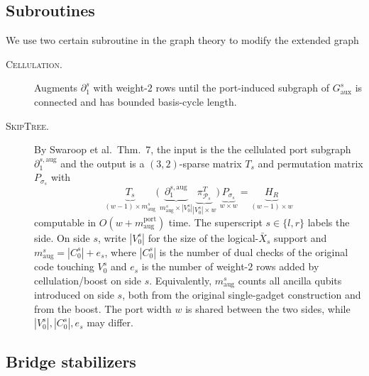\documentclass[a4paper, 12pt]{article}
\begin{document}
  \subsection{Subroutines}
  We use two certain subroutine in the graph theory to modify the extended graph
  \begin{description}
  \item[\textsc{Cellulation}.] Augments $\partial_1^{s}$ with weight-$2$ rows until the port-induced
  subgraph of $G_{\mathrm{aux}}^s$ is connected and has bounded basis-cycle length.
  \item[\textsc{SkipTree}.]     By Swaroop et al.\ Thm.~7, the input is the  the cellulated port subgraph $\partial_1^{s,\mathrm{aug}}$ and the output is a $(3,2)$-sparse
  matrix $T_s$ and permutation matrix $P_{\sigma_s}$ with
   \begin{equation}
  \underbrace{T_s}_{(w-1)\times m^s_{\mathrm{aug}}}
  \Bigg(\underbrace{\partial_1^{s,\mathrm{aug}}}_{m^s_{\mathrm{aug}}\times|V_0^s|}
  \underbrace{\pi_{\mathcal{P}_s}^T}_{|V_0^s|\times w}
  \Bigg)
  \underbrace{P_{\sigma_s}}_{w\times w}
  =
  \underbrace{H_R}_{(w-1)\times w}
  \end{equation}
  computable in $O(w + m^{\mathrm{port}}_{\mathrm{aug}})$ time. The superscript $s \in \{l, r\}$ labels the side. On side $s$, write $|V_0^s|$ for
   the size of the logical-$\bar X_s$ support and $m^s_{\mathrm{aug}} = |C_0^s| + e_s$, where $|C_0^s|$ is the number of dual checks of the original code touching $V_0^s$ and $e_s$ is the
  number of weight-$2$ rows added by cellulation/boost on side $s$. Equivalently, $m^s_{\mathrm{aug}}$
  counts all ancilla qubits introduced on side $s$, both from the original single-gadget construction and
  from the boost. The port width $w$ is shared between the two sides, while $|V_0^s|, |C_0^s|, e_s$ may
  differ.

   
  \end{description}

  \subsection{Bridge stabilizers}
\end{document}
